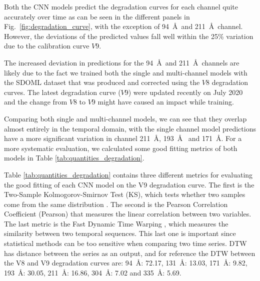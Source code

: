 \documentclass[twocolumn,usenames,dvipsnames]{aastex63}
\begin{document}
Both the CNN models predict the degradation curves for each channel quite accurately over time as can be seen in the different panels in Fig.~\ref{fig:degradation_curve}, with the exception of 94~\AA\ and 211~\AA\ channel. However, the deviations of the predicted values fall well within the 25\% variation due to the calibration curve $V9$. 

The increased deviation in predictions for the 94~\AA\ and 211~\AA\ channels are likely due to the fact we trained both the single and multi-channel models with the SDOML dataset that was produced and corrected using the $V8$ degradation curves. The latest degradation curve ($V9$) were updated recently on July 2020 and the change from $V8$ to $V9$ might have caused an impact while training.

Comparing both single and multi-channel models, we can see that they overlap almost entirely in the temporal domain, with the single channel model predictions have a more significant variation in channel 211~\AA, 193~\AA~ and 171~\AA. For a more systematic evaluation, we calculated some good fitting metrics of both models in Table \ref{tab:quantities_degradation}.

Table \ref{tab:quantities_degradation} contains three different metrics for evaluating the good fitting of each CNN model on the V9 degradation curve. The first is the Two-Sample Kolmogorov-Smirnov Test (KS), which tests whether two samples come from the same distribution \citep{doi:10.1080/01621459.1951.10500769}. The second is the Pearson Correlation Coefficient (Pearson) that measures the linear correlation between two variables. The last metric is the Fast Dynamic Time Warping \citep[DTW, ][]{fastDTW}, which measures the similarity between two temporal sequences. This last one is important since statistical methods can be too sensitive when comparing two time series. DTW has distance between the series as an output, and for reference the DTW between the V8 and V9 degradation curves are: 94~\AA: 72.17, 131~\AA: 13.03, 171~\AA: 9.82, 193~\AA: 30.05, 211~\AA: 16.86, 304~\AA: 7.02 and 335~\AA: 5.69.
\end{document}
